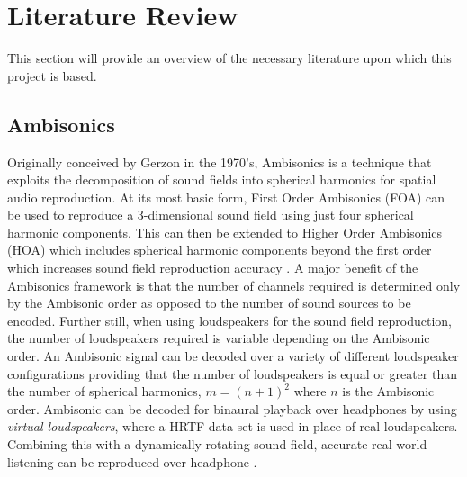 
















\section{Literature Review} \label{lit}

	This section will provide an overview of the necessary literature upon which this project is based. \\

	\subsection{Ambisonics}

		Originally conceived by Gerzon \cite{gerzon1973} in the 1970's, Ambisonics is a technique that exploits the decomposition of sound fields into spherical harmonics for spatial audio reproduction. At its most basic form, First Order Ambisonics (FOA) can be used to reproduce a 3-dimensional sound field using just four spherical harmonic components. This can then be extended to Higher Order Ambisonics (HOA) which includes spherical harmonic components beyond the first order which increases sound field reproduction accuracy \cite{Bertet2007}. A major benefit of the Ambisonics framework is that the number of channels required is determined only by the Ambisonic order as opposed to the number of sound sources to be encoded. Further still, when using loudspeakers for the sound field reproduction, the number of loudspeakers required is variable depending on the Ambisonic order. An Ambisonic signal can be decoded over a variety of different loudspeaker configurations providing that the number of loudspeakers is equal or greater than the number of spherical harmonics, $m =(n+1)^2$ where $n$ is the Ambisonic order. Ambisonic can be decoded for binaural playback over headphones by using \textit{virtual loudspeakers}, where a HRTF data set is used in place of real loudspeakers. Combining this with a dynamically rotating sound field, accurate real world listening can be reproduced over headphone \cite{Mckeag1996} \cite{Noisternig2003}. \\

